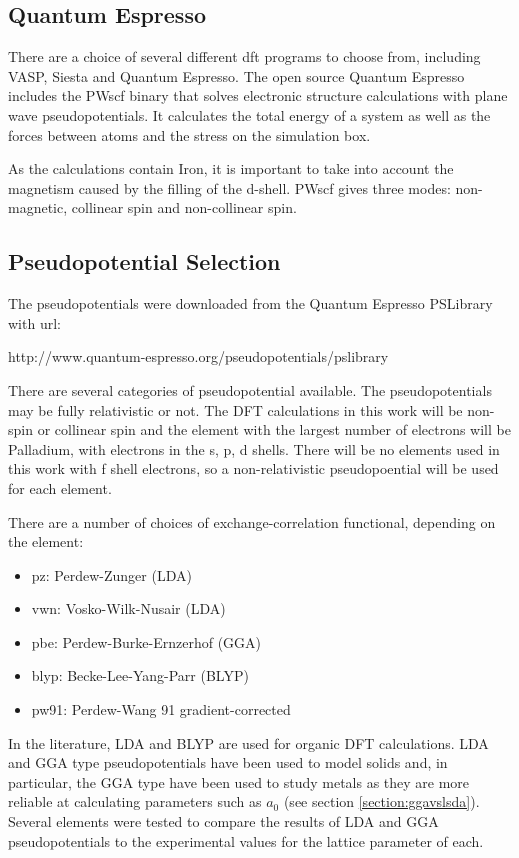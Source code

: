 \subsection{Quantum Espresso}

There are a choice of several different \acrshort{dft} programs to choose from, including VASP, Siesta and Quantum Espresso.  The open source Quantum Espresso includes the PWscf binary that solves electronic structure calculations with plane wave pseudopotentials.  It calculates the total energy of a system as well as the forces between atoms and the stress on the simulation box.  

As the calculations contain Iron, it is important to take into account the magnetism caused by the filling of the d-shell.  PWscf gives three modes: non-magnetic, collinear spin and non-collinear spin.  



\subsection{Pseudopotential Selection}

The pseudopotentials were downloaded from the Quantum Espresso PSLibrary with url:

http://www.quantum-espresso.org/pseudopotentials/pslibrary 

There are several categories of pseudopotential available.  The pseudopotentials may be fully relativistic or not.  The DFT calculations in this work will be non-spin or collinear spin and the element with the largest number of electrons will be Palladium, with electrons in the s, p, d shells.  There will be no elements used in this work with f shell electrons, so a non-relativistic pseudopoential will be used for each element.

There are a number of choices of exchange-correlation functional, depending on the element:

\begin{itemize}
\item pz: Perdew-Zunger (LDA)
\item vwn: Vosko-Wilk-Nusair (LDA)
\item pbe: Perdew-Burke-Ernzerhof (GGA)
\item blyp: Becke-Lee-Yang-Parr (BLYP)
\item pw91: Perdew-Wang 91 gradient-corrected 
\end{itemize}

In the literature, LDA and BLYP are used for organic DFT calculations.  LDA and GGA type pseudopotentials have been used to model solids and, in particular, the GGA type have been used to study metals as they are more reliable at calculating parameters such as $a_0$ (see section \ref{section:ggavslsda}).  Several elements were tested to compare the results of LDA and GGA pseudopotentials to the experimental values for the lattice parameter of each.

